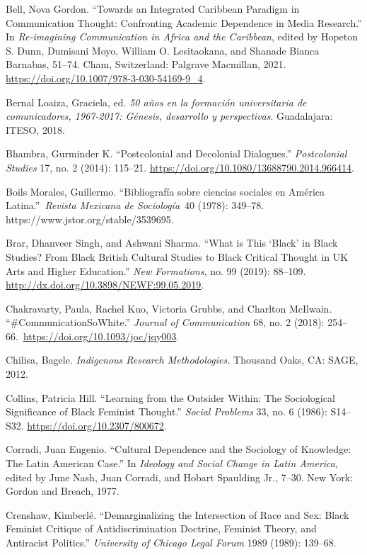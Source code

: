 \documentclass{tufte-handout}
\begin{document}
\begin{hangparas}{.25in}{1}
Bell, Nova Gordon. ``Towards an Integrated Caribbean Paradigm in
Communication Thought: Confronting Academic Dependence in Media
Research.'' In \emph{Re-imagining Communication in Africa and the
Caribbean}, edited by Hopeton S. Dunn, Dumisani Moyo, William O.
Lesitaokana, and Shanade Bianca Barnabas, 51--74. Cham, Switzerland:
Palgrave Macmillan, 2021.
\url{https://doi.org/10.1007/978-3-030-54169-9_4}.

Bernal Loaiza, Graciela, ed. \emph{50 años en la formación universitaria
de comunicadores, 1967-2017: Génesis, desarrollo y perspectivas}.
Guadalajara: ITESO, 2018.

Bhambra, Gurminder K. ``Postcolonial and Decolonial Dialogues.''
\emph{Postcolonial Studies} 17, no. 2 (2014): 115--21.
\url{https://doi.org/10.1080/13688790.2014.966414}.

Boils Morales, Guillermo. ``Bibliografía sobre ciencias sociales en
América Latina.''~\emph{Revista Mexicana de Sociología}~40 (1978):
349--78. https://www.jstor.org/stable/3539695.

Brar, Dhanveer Singh, and Ashwani Sharma. ``What is This `Black' in
Black Studies? From Black British Cultural Studies to Black Critical
Thought in UK Arts and Higher Education.'' \emph{New Formations}, no. 99
(2019): 88--109. \url{http://dx.doi.org/10.3898/NEWF:99.05.2019}.

Chakravarty, Paula, Rachel Kuo, Victoria Grubbs, and Charlton McIlwain.
``\#CommunicationSoWhite.'' \emph{Journal of Communication} 68, no. 2
(2018): 254--66.~\url{https://doi.org/10.1093/joc/jqy003}.

Chilisa, Bagele. \emph{Indigenous Research Methodologies.} Thousand
Oaks, CA: SAGE, 2012.

Collins, Patricia Hill. ``Learning from the Outsider Within: The
Sociological Significance of Black Feminist Thought.'' \emph{Social
Problems} 33, no. 6 (1986): S14--S32.
\url{https://doi.org/10.2307/800672}.

Corradi, Juan Eugenio. ``Cultural Dependence and the Sociology of
Knowledge: The Latin American Case.'' In \emph{Ideology and Social
Change in Latin America}, edited by June Nash, Juan Corradi, and Hobart
Spaulding Jr., 7--30. New York: Gordon and Breach, 1977.

Crenshaw, Kimberlé. ``Demarginalizing the Intersection of Race and Sex:
Black Feminist Critique of Antidiscrimination Doctrine, Feminist Theory,
and Antiracist Politics.'' \emph{University of Chicago Legal Forum} 1989
(1989): 139--68.


\end{hangparas}
\end{document}
